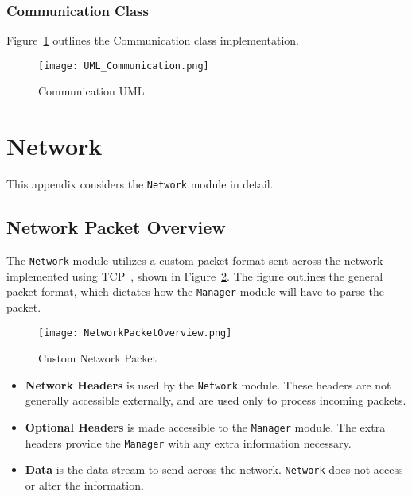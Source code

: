 \documentclass[sigconf]{acmart}
\begin{document}
\subsubsection{Communication Class}
Figure~\ref{Communication UML} outlines the Communication class implementation.
\begin{figure}[htb]
	\begin{center}
		\texttt{[image: UML\_Communication.png]}
		\caption{Communication UML}
		\label{Communication UML}
	\end{center}
\end{figure}



\appendix
\section{Network} %
This appendix considers the \texttt{Network} module in detail.

\subsection{Network Packet Overview}
The \texttt{Network} module utilizes a custom packet format sent across the network implemented
using TCP~\cite{Postel:rfc793}, shown in Figure~\ref{Network Packet Overview}. The figure outlines the general packet
format, which dictates how the \texttt{Manager} module will have to parse the packet.
\begin{figure} [htb]
	\centering
	\texttt{[image: NetworkPacketOverview.png]}
	\caption{Custom Network Packet}
	\label{Network Packet Overview}
\end{figure}

\begin{itemize}
	\item \textbf{Network Headers} is used by the \texttt{Network} module. These headers are not
	      generally accessible externally, and are used only to process incoming packets.
	\item \textbf{Optional Headers} is made accessible to the \texttt{Manager} module. The extra
	      headers provide the \texttt{Manager} with any extra information necessary.
	\item \textbf{Data} is the data stream to send across the network. \texttt{Network} does not
	      access or alter the information.
\end{itemize}
\end{document}

